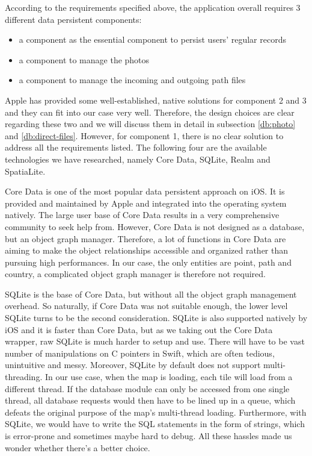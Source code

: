\documentclass[12pt,a4paper]{article}
\begin{document}
            According to the requirements specified above, the application overall requires 3 different data persistent components: 
                \begin{itemize}
                    \setlength\itemsep{-0.5em}
                    \item a component as the essential component to persist users' regular records
                    \item a component to manage the photos
                    \item a component to manage the incoming and outgoing path files
                \end{itemize}
            Apple has provided some well-established, native solutions for component 2 and 3 and they can fit into our case very well. Therefore, the design choices are clear regarding these two and we will discuss them in detail in subsection \ref{db:photo} and \ref{db:direct-files}. However, for component 1, there is no clear solution to address all the requirements listed. The following four are the available technologies we have researched, namely Core Data, SQLite, Realm and SpatiaLite.
                
            Core Data is one of the most popular data persistent approach on iOS. It is provided and maintained by Apple and integrated into the operating system natively. The large user base of Core Data results in a very comprehensive community to seek help from. However, Core Data is not designed as a database, but an object graph manager. Therefore, a lot of functions in Core Data are aiming to make the object relationships accessible and organized rather than pursuing high performances. In our case, the only entities are point, path and country, a complicated object graph manager is therefore not required.
            
            SQLite is the base of Core Data, but without all the object graph management overhead. So naturally, if Core Data was not suitable enough, the lower level SQLite turns to be the second consideration. SQLite is also supported natively by iOS and it is faster than Core Data, but as we taking out the Core Data wrapper, raw SQLite is much harder to setup and use. There will have to be vast number of manipulations on C pointers in Swift, which are often tedious, unintuitive and messy. Moreover, SQLite by default does not support multi-threading. In our use case, when the map is loading, each tile will load from a different thread. If the database module can only be accessed from one single thread, all database requests would then have to be lined up in a queue, which defeats the original purpose of the map's multi-thread loading. Furthermore, with SQLite, we would have to write the SQL statements in the form of strings, which is error-prone and sometimes maybe hard to debug. All these hassles made us wonder whether there’s a better choice.
\end{document}
